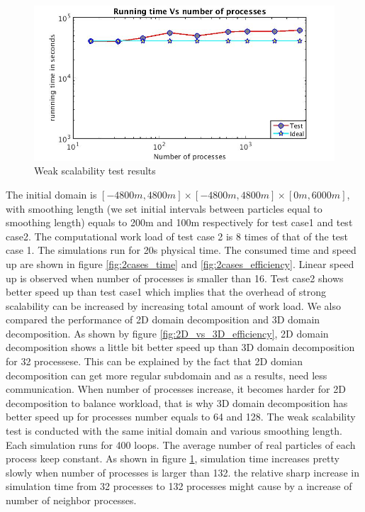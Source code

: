 \documentclass[conference,compsoc]{IEEEtran}
\begin{document}
%
\begin{figure}[!t]
\centering
\includegraphics[scale=0.33]{weak_loglog}
\caption{Weak scalability test results}
\label{fig:weak_loglog}
\end{figure}
The initial domain is $[-4800m,4800m]\times [-4800m,4800m] \times [0m, 6000m]$, with smoothing length (we set initial intervals between particles equal to smoothing length) equals to 200m and 100m respectively for test case1 and test case2. The computational work load of test case 2 is 8 times of that of the test case 1. The simulations run for 20s physical time. The consumed time and speed up are shown in figure \ref{fig:2cases_time} and \ref{fig:2cases_efficiency}. Linear speed up is observed when number of processes is smaller than 16. Test case2 shows better speed up than test case1 which implies that the overhead of strong scalability can be increased by increasing total amount of work load. We also compared the performance of 2D domain decomposition and 3D domain decomposition. As shown by figure \ref{fig:2D_vs_3D_efficiency}, 2D domain decomposition shows a little bit better speed up than 3D domain decomposition for 32 processese. This can be explained by the fact that 2D domian decomposition can get more regular subdomain and as a results, need less communication. When number of processes increase, it becomes harder for 2D decomposition to balance workload, that is why 3D domain decomposition has better speed up for processes number equals to 64 and 128. The weak scalability test is conducted with the same initial domain and various smoothing length. Each simulation runs for 400 loops. The average number of real particles of each process keep constant. As shown in figure \ref{fig:weak_loglog}, simulation time increases pretty slowly when number of processes is larger than 132. the relative sharp increase in simulation time from 32 processes to 132 processes might cause by a increase of number of neighbor processes. 
\end{document}
